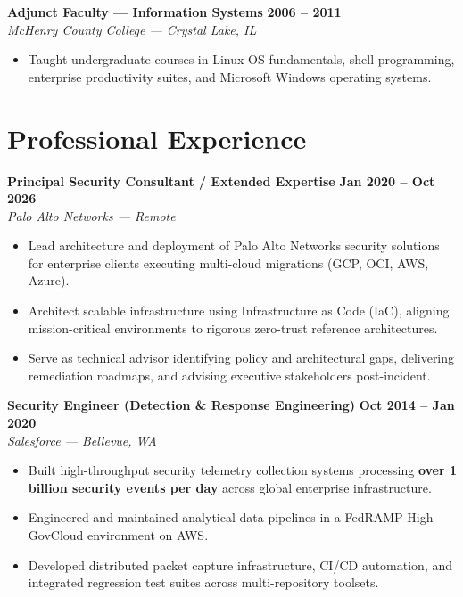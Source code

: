 \documentclass[10pt, a4paper]{article}
\begin{document}
\vspace{4pt}
\noindent\textbf{Adjunct Faculty --- Information Systems} \hfill {\color{muted}\textbf{2006 -- 2011}} \\
{\color{textdark}\textit{McHenry County College --- Crystal Lake, IL}}
\begin{itemize}
    \item Taught undergraduate courses in Linux OS fundamentals, shell programming, enterprise productivity suites, and Microsoft Windows operating systems.
\end{itemize}

\section{Professional Experience}
\noindent\textbf{Principal Security Consultant / Extended Expertise} \hfill {\color{muted}\textbf{Jan 2020 -- Oct 2026}} \\
{\color{textdark}\textit{Palo Alto Networks --- Remote}}
\begin{itemize}
    \item Lead architecture and deployment of Palo Alto Networks security solutions for enterprise clients executing multi-cloud migrations (GCP, OCI, AWS, Azure).
    \item Architect scalable infrastructure using Infrastructure as Code (IaC), aligning mission-critical environments to rigorous zero-trust reference architectures.
    \item Serve as technical advisor identifying policy and architectural gaps, delivering remediation roadmaps, and advising executive stakeholders post-incident.
\end{itemize}

\vspace{4pt}
\noindent\textbf{Security Engineer (Detection \& Response Engineering)} \hfill {\color{muted}\textbf{Oct 2014 -- Jan 2020}} \\
{\color{textdark}\textit{Salesforce --- Bellevue, WA}}
\begin{itemize}
    \item Built high-throughput security telemetry collection systems processing \textbf{over 1 billion security events per day} across global enterprise infrastructure.
    \item Engineered and maintained analytical data pipelines in a FedRAMP High GovCloud environment on AWS.
    \item Developed distributed packet capture infrastructure, CI/CD automation, and integrated regression test suites across multi-repository toolsets.
\end{itemize}
\end{document}
